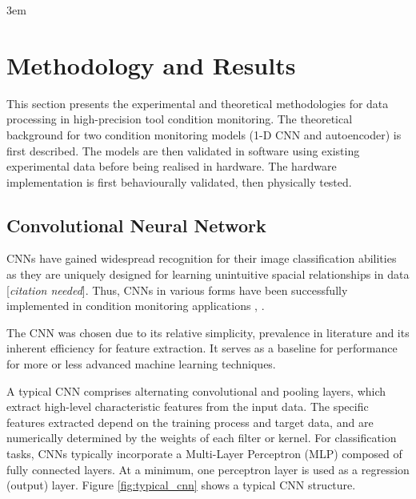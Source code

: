 \documentclass[../main.tex]{subfiles}
\newcommand{\citationneeded}{[\textit{citation needed}]}
\begin{document}
\emergencystretch 3em

\section{Methodology and Results}


This section presents the experimental and theoretical methodologies for data processing in high-precision tool condition monitoring. The theoretical background for two condition monitoring models (1-D CNN and autoencoder) is first described. The models are then validated in software using existing experimental data before being realised in hardware. The hardware implementation is first behaviourally validated, then physically tested.


\subsection{Convolutional Neural Network}

CNNs have gained widespread recognition for their image classification abilities as they are uniquely designed for learning unintuitive spacial relationships in data \citationneeded. Thus, CNNs in various forms have been successfully implemented in condition monitoring applications \cite{RN16}, \cite{RN17}.

The CNN was chosen due to its relative simplicity, prevalence in literature and its inherent efficiency for feature extraction. It serves as a baseline for performance for more or less advanced machine learning techniques.

A typical CNN comprises alternating convolutional and pooling layers, which extract high-level characteristic features from the input data. The specific features extracted depend on the training process and target data, and are numerically determined by the weights of each filter or kernel. For classification tasks, CNNs typically incorporate a Multi-Layer Perceptron (MLP) composed of fully connected layers. At a minimum, one perceptron layer is used as a regression (output) layer. Figure \ref{fig:typical_cnn} shows a typical CNN structure.
\end{document}
